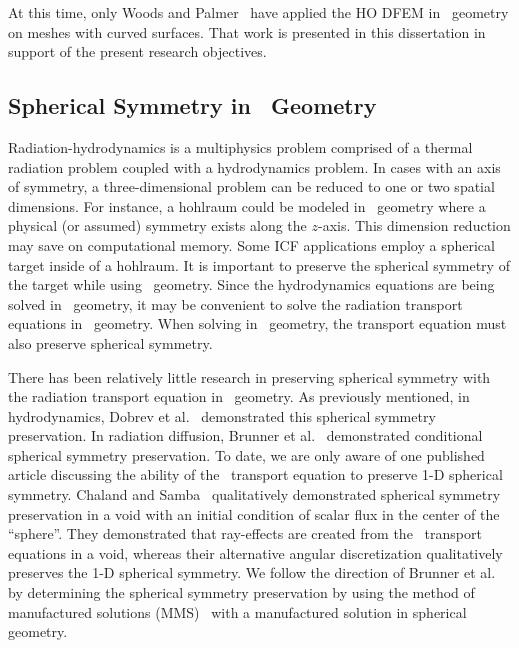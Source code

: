 \documentclass[12pt,letterpaper]{article}
\begin{document}
At this time, only Woods and Palmer~\cite{Woods2018RZJCTT} have applied the HO DFEM in \RZ\ geometry on meshes with curved surfaces. That work is presented in this dissertation in support of the present research objectives.

\subsection{Spherical Symmetry in \RZ\ Geometry}
\label{sec:SphericalSymmetryIntro}
Radiation-hydrodynamics is a multiphysics problem comprised of a thermal radiation problem coupled with a hydrodynamics problem. In cases with an axis of symmetry, a three-dimensional problem can be reduced to one or two spatial dimensions. For instance, a hohlraum could be modeled in \RZ\ geometry where a physical (or assumed) symmetry exists along the $z$-axis. This dimension reduction may save on computational memory. Some ICF applications employ a spherical target inside of a hohlraum. It is important to preserve the spherical symmetry of the target while using \RZ\ geometry. Since the hydrodynamics equations are being solved in \RZ\ geometry, it may be convenient to solve the radiation transport equations in \RZ\ geometry. When solving in \RZ\ geometry, the transport equation must also preserve spherical symmetry.

\begin{comment}
Despite the convenience of describing the analytical position within a sphere using spherical coordinates, the spatial discretization becomes much more complicated. It can be more convenient to solve a spherical problem using \RZ\ geometry because there are more angular derivatives in the streaming term of the radiation transport equation in spherical coordinates than in cylindrical. The increased complexity is analogous to the increased complexity of using \RZ\ geometry from Cartesian coordinates.
\end{comment}

There has been relatively little research in preserving spherical symmetry with the radiation transport equation in \RZ\ geometry. As previously mentioned, in hydrodynamics, Dobrev et al.~\cite{DobrevHOAxisymmetric} demonstrated this spherical symmetry preservation. In radiation diffusion, Brunner et al.~\cite{BrunnerSphericalsymmetry} demonstrated conditional spherical symmetry preservation. To date, we are only aware of one published article discussing the ability of the \RZ\ transport equation to preserve 1-D spherical symmetry. Chaland and Samba~\cite{Chaland2016SphericalSymmetry} qualitatively demonstrated spherical symmetry preservation in a void with an initial condition of scalar flux in the center of the ``sphere''. They demonstrated that ray-effects are created from the \SN\ transport equations in a void, whereas their alternative angular discretization qualitatively preserves the 1-D spherical symmetry. We follow the direction of Brunner et al.~\cite{BrunnerSphericalsymmetry} by determining the spherical symmetry preservation by using the method of manufactured solutions (MMS)~\cite{Lingus} with a manufactured solution in spherical geometry.
\end{document}

